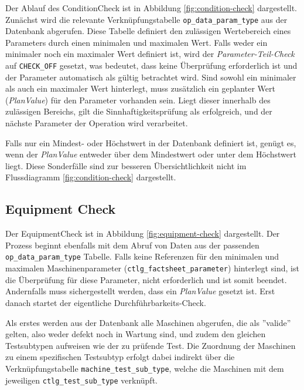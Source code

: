 Der Ablauf des \gls{ConditionCheck} ist in Abbildung \ref{fig:condition-check} dargestellt. Zunächst wird die relevante Verknüpfungstabelle \texttt{op\_data\_param\_type} aus der Datenbank abgerufen. Diese Tabelle definiert den zulässigen Wertebereich eines Parameters durch einen minimalen und maximalen Wert. Falls weder ein minimaler noch ein maximaler Wert definiert ist, wird der \textit{Parameter-Teil-Check} auf \texttt{CHECK\_OFF} gesetzt, was bedeutet, dass keine Überprüfung erforderlich ist und der Parameter automatisch als gültig betrachtet wird. Sind sowohl ein minimaler als auch ein maximaler Wert hinterlegt, muss zusätzlich ein geplanter Wert (\textit{PlanValue}) für den Parameter vorhanden sein. Liegt dieser innerhalb des zulässigen Bereichs, gilt die Sinnhaftigkeitsprüfung als erfolgreich, und der nächste Parameter der Operation wird verarbeitet.


Falls nur ein Mindest- oder Höchstwert in der Datenbank definiert ist, genügt es, wenn der \textit{PlanValue} entweder über dem Mindestwert oder unter dem Höchstwert liegt. Diese Sonderfälle sind zur besseren Übersichtlichkeit nicht im Flussdiagramm \ref{fig:condition-check} dargestellt.




\subsection{Equipment Check}
Der \gls{EquipmentCheck} ist in Abbildung \ref{fig:equipment-check} dargestellt. Der Prozess beginnt ebenfalls mit dem Abruf von Daten aus der passenden \texttt{op\_data\_param\_type} Tabelle. Falls keine Referenzen für den minimalen und maximalen Maschinenparameter (\texttt{ctlg\_factsheet\_parameter}) hinterlegt sind, ist die Überprüfung für diese Parameter, nicht erforderlich und ist somit beendet. Andernfalls muss sichergestellt werden, dass ein \textit{PlanValue} gesetzt ist. Erst danach startet der eigentliche Durchführbarkeits-Check.

Als erstes werden aus der Datenbank alle Maschinen abgerufen, die als ''valide'' gelten, also weder defekt noch in Wartung sind, und zudem den gleichen Testsubtypen aufweisen wie der zu prüfende Test. Die Zuordnung der Maschinen zu einem spezifischen Testsubtyp erfolgt dabei indirekt über die Verknüpfungstabelle \texttt{machine\_test\_sub\_type}, welche die Maschinen mit dem jeweiligen \texttt{ctlg\_test\_sub\_type} verknüpft.

